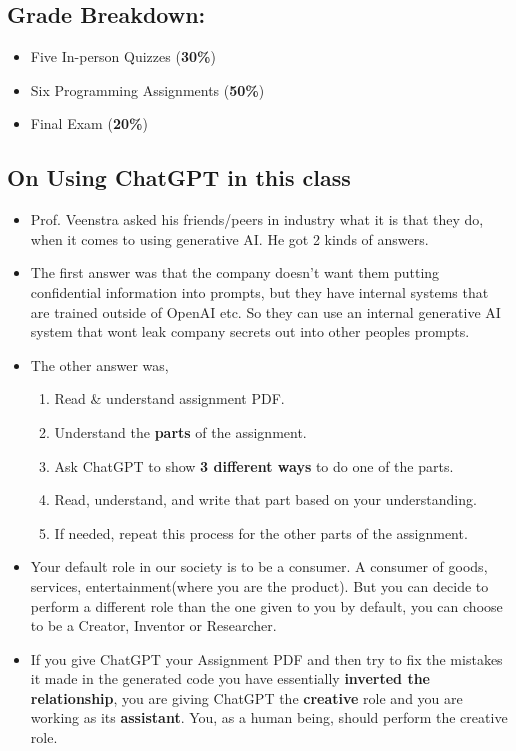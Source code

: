 \documentclass{article}
\begin{document}
\subsection*{Grade Breakdown:}

\begin{itemize}
    \item Five In-person Quizzes (\textbf{30\%})
    \item Six Programming Assignments (\textbf{50\%})
    \item Final Exam (\textbf{20\%})
\end{itemize}
 
\subsection*{On Using ChatGPT in this class}

\begin{itemize}
    \item Prof. Veenstra asked his friends/peers in industry what it is that they do, when it comes to using generative AI. He got 2 kinds of answers.
    \item The first answer was that the company doesn't want them putting confidential information into prompts, but they have internal systems that are trained outside of OpenAI etc. So they can use an internal generative AI system that wont leak company secrets out into other peoples prompts.
    \item The other answer was, 
    \begin{enumerate}
        \item Read \& understand assignment PDF.
        \item Understand the \textbf{parts} of the assignment.
        \item Ask ChatGPT to show \textbf{3 different ways} to do one of the parts.
        \item Read, understand, and write that part based on your understanding.
        \item If needed, repeat this process for the other parts of the assignment.
    \end{enumerate}
    \item Your default role in our society is to be a consumer. A consumer of goods, services, entertainment(where you are the product). But you can decide to perform a different role than the one given to you by default, you can choose to be a Creator, Inventor or Researcher.
    \item If you give ChatGPT your Assignment PDF and then try to fix the mistakes it made in the generated code you have essentially \textbf{inverted the relationship}, you are giving ChatGPT the \textbf{creative} role and you are working as its \textbf{assistant}. You, as a human being, should perform the creative role.
\end{itemize}
\end{document}
